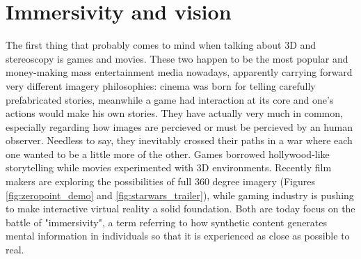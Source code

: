 \section{Immersivity and vision}
The first thing that probably comes to mind when talking about 3D and stereoscopy is games and movies. These two happen to be the most popular and money-making mass entertainment media nowadays, apparently carrying forward very different imagery philosophies: cinema was born for telling carefully prefabricated stories, meanwhile a game had interaction at its core and one’s actions would make his own stories. They have actually very much in common, especially regarding how images are percieved or must be percieved by an human observer. Needless to say, they inevitably crossed their paths in a war where each one wanted to be a little more of the other. Games borrowed hollywood-like storytelling while movies experimented with 3D environments. Recently film makers are exploring the possibilities of full 360 degree imagery (Figures \ref{fig:zeropoint_demo} and \ref{fig:starwars_trailer}), while gaming industry is pushing to make interactive virtual reality a solid foundation. Both are today focus on the battle of "immersivity", a term referring to how synthetic content generates mental information in individuals so that it is experienced as close as possible to real.\\
